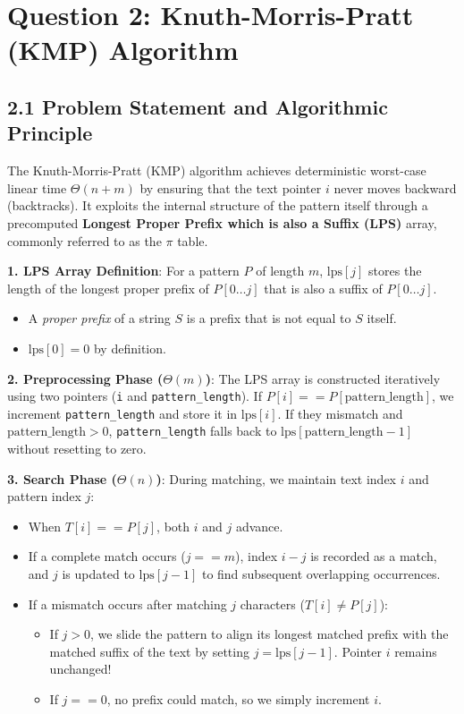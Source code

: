 \documentclass[12pt]{article}
\begin{document}
\vspace{0.4cm}

\section*{Question 2: Knuth-Morris-Pratt (KMP) Algorithm}

\subsection*{2.1 Problem Statement and Algorithmic Principle}
The Knuth-Morris-Pratt (KMP) algorithm achieves deterministic worst-case linear time $\Theta(n + m)$ by ensuring that the text pointer $i$ never moves backward (backtracks). It exploits the internal structure of the pattern itself through a precomputed \textbf{Longest Proper Prefix which is also a Suffix (LPS)} array, commonly referred to as the $\pi$ table.

\textbf{1. LPS Array Definition}:
For a pattern $P$ of length $m$, $\text{lps}[j]$ stores the length of the longest proper prefix of $P[0 \dots j]$ that is also a suffix of $P[0 \dots j]$. 
\begin{itemize}
    \item A \textit{proper prefix} of a string $S$ is a prefix that is not equal to $S$ itself.
    \item $\text{lps}[0] = 0$ by definition.
\end{itemize}

\textbf{2. Preprocessing Phase ($\Theta(m)$)}:
The LPS array is constructed iteratively using two pointers (\texttt{i} and \texttt{pattern\_length}). If $P[i] == P[\text{pattern\_length}]$, we increment \texttt{pattern\_length} and store it in $\text{lps}[i]$. If they mismatch and $\text{pattern\_length} > 0$, \texttt{pattern\_length} falls back to $\text{lps}[\text{pattern\_length}-1]$ without resetting to zero.

\textbf{3. Search Phase ($\Theta(n)$)}:
During matching, we maintain text index $i$ and pattern index $j$:
\begin{itemize}
    \item When $T[i] == P[j]$, both $i$ and $j$ advance.
    \item If a complete match occurs ($j == m$), index $i - j$ is recorded as a match, and $j$ is updated to $\text{lps}[j-1]$ to find subsequent overlapping occurrences.
    \item If a mismatch occurs after matching $j$ characters ($T[i] \ne P[j]$):
    \begin{itemize}
        \item If $j > 0$, we slide the pattern to align its longest matched prefix with the matched suffix of the text by setting $j = \text{lps}[j-1]$. Pointer $i$ remains unchanged!
        \item If $j == 0$, no prefix could match, so we simply increment $i$.
    \end{itemize}
\end{itemize}
\end{document}
